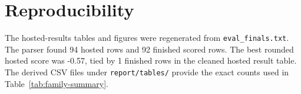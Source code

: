 \documentclass[11pt]{article}
\begin{document}
\section{Reproducibility}
The hosted-results tables and figures were regenerated from \texttt{eval\_finals.txt}. The parser found 94 hosted rows and 92 finished scored rows. The best rounded hosted score was -0.57, tied by 1 finished rows in the cleaned hosted result table. The derived CSV files under \texttt{report/tables/} provide the exact counts used in Table~\ref{tab:family-summary}.



\end{document}
